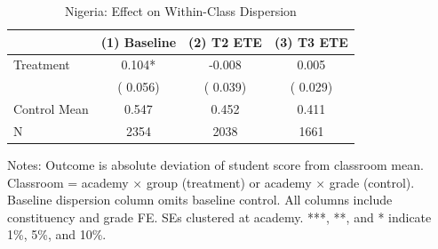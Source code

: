 \begin{table}[!htbp]
\centering
\caption{Nigeria: Effect on Within-Class Dispersion}
\label{tab:ng_dispersion}
\begin{threeparttable}
\begin{tabular}[t]{lccc}
\toprule
 & (1) Baseline & (2) T2 ETE & (3) T3 ETE \\
\midrule
Treatment &   0.104* &  -0.008 &   0.005 \\
 & (  0.056) & (  0.039) & (  0.029) \\
\addlinespace
Control Mean &   0.547 &   0.452 &   0.411 \\
N & 2354 & 2038 & 1661 \\
\bottomrule
\end{tabular}
\begin{tablenotes}[para]
\item Notes: Outcome is absolute deviation of student score from classroom mean. Classroom = academy $\times$ group (treatment) or academy $\times$ grade (control). Baseline dispersion column omits baseline control. All columns include constituency and grade FE. SEs clustered at academy. ***, **, and * indicate 1\%, 5\%, and 10\%.
\end{tablenotes}
\end{threeparttable}
\end{table}

